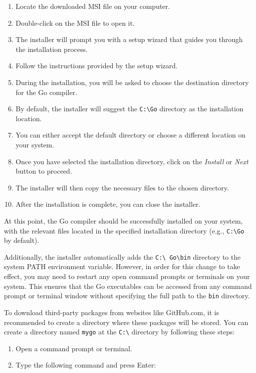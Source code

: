 \begin{enumerate}
\item Locate the downloaded MSI file on your computer.
\item Double-click on the MSI file to open it.
\item The installer will prompt you with a setup wizard that guides you through the installation process.
\item Follow the instructions provided by the setup wizard.
\item During the installation, you will be asked to choose the destination directory for the Go compiler.
\item By default, the installer will suggest the \texttt{C:\textbackslash Go} directory as the installation location.
\item You can either accept the default directory or choose a different location on your system.
\item Once you have selected the installation directory, click on the \textit{Install} or \textit{Next} button to proceed.
\item The installer will then copy the necessary files to the chosen directory.
\item After the installation is complete, you can close the installer.
\end{enumerate}

At this point, the Go compiler should be successfully installed on your system,
with the relevant files located in the specified installation directory
(e.g., \texttt{C:\textbackslash Go} by default).

Additionally, the installer automatically adds the \texttt{C:\textbackslash
Go\textbackslash bin} directory to the system PATH environment variable.
However, in order for this change to take effect, you may need to restart any
open command prompts or terminals on your system. This ensures that the Go
executables can be accessed from any command prompt or terminal window without
specifying the full path to the \texttt{bin} directory.

To download third-party packages from websites like GitHub.com, it is
recommended to create a directory where these packages will be stored. You can
create a directory named \texttt{mygo} at the \texttt{C:\textbackslash}
directory by following these steps:

\begin{enumerate}
\item Open a command prompt or terminal.
\item Type the following command and press Enter:
\end{enumerate}

